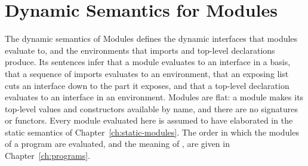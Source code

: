 \chapter{Dynamic Semantics for Modules}\label{ch:dynamic-modules}

The dynamic semantics of Modules defines the dynamic interfaces that modules
evaluate to, and the environments that imports and top-level declarations
produce. Its sentences infer that a module evaluates to an interface in a
basis, that a sequence of imports evaluates to an environment, that an
exposing list cuts an interface down to the part it exposes, and that a
top-level declaration evaluates to an interface in an environment. Modules
are flat: a module makes its top-level values and constructors available by
name, and there are no signatures or functors. %
Every module evaluated here is assumed to have elaborated in the static
semantics of Chapter~\ref{ch:static-modules}. %
The order in which the modules of a program are evaluated, and the meaning of
, are given in Chapter~\ref{ch:programs}.


